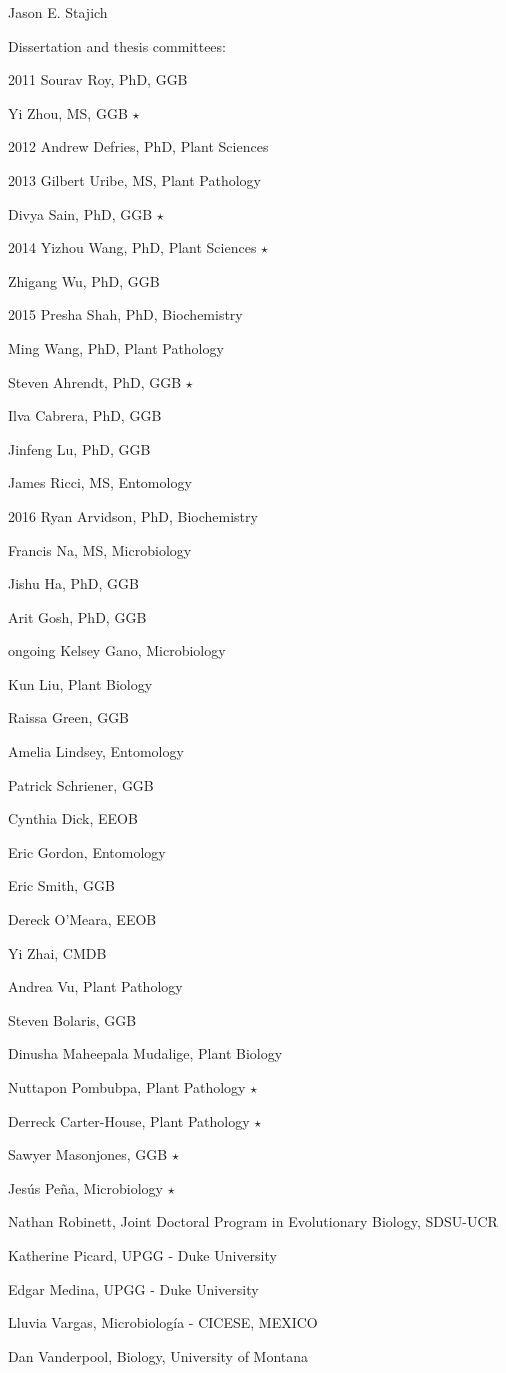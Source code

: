 \documentclass[10pt]{article}
\begin{document}
\begin{cv}{\centerline{Jason E. Stajich}}
\begin{cvlistcompact}{Dissertation and thesis committees:}
\item [2011] Sourav Roy, PhD, GGB
\item Yi Zhou, MS, GGB $\star$
\item [2012] Andrew Defries, PhD, Plant Sciences
\item [2013] Gilbert Uribe, MS, Plant Pathology
\item Divya Sain, PhD, GGB $\star$
\item [2014] Yizhou Wang, PhD, Plant Sciences $\star$
\item Zhigang Wu, PhD, GGB
\item [2015] Presha Shah, PhD, Biochemistry
\item Ming Wang, PhD, Plant Pathology
\item Steven Ahrendt, PhD, GGB $\star$
\item Ilva Cabrera, PhD, GGB
\item Jinfeng Lu, PhD, GGB
\item James Ricci, MS, Entomology
\item [2016] Ryan Arvidson, PhD, Biochemistry
\item Francis Na, MS, Microbiology
\item Jishu Ha, PhD, GGB
\item Arit Gosh, PhD, GGB
\item [ongoing] Kelsey Gano, Microbiology
\item Kun Liu, Plant Biology
\item Raissa Green, GGB
\item Amelia Lindsey, Entomology
\item Patrick Schriener, GGB
\item Cynthia Dick, EEOB
\item Eric Gordon, Entomology
\item Eric Smith, GGB
\item Dereck O'Meara, EEOB
\item Yi Zhai, CMDB
\item Andrea Vu, Plant Pathology
\item Steven Bolaris, GGB
\item Dinusha Maheepala Mudalige, Plant Biology
\item Nuttapon Pombubpa, Plant Pathology $\star$
\item Derreck Carter-House, Plant Pathology $\star$
\item Sawyer Masonjones, GGB $\star$
\item Jes\'{u}s Pe\~{n}a, Microbiology $\star$
\item Nathan Robinett, Joint Doctoral Program in Evolutionary Biology, SDSU-UCR
\item Katherine Picard, UPGG - Duke University
\item Edgar Medina, UPGG - Duke University
\item Lluvia Vargas, Microbiolog\'{i}a - CICESE, MEXICO
\item Dan Vanderpool, Biology, University of Montana
\end{cvlistcompact}
\end{cv}
\end{document}
